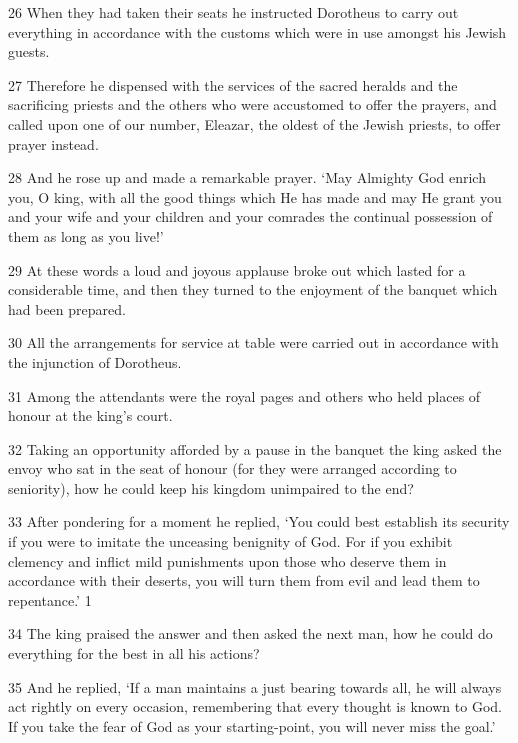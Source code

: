 \par 26 When they had taken their seats he instructed Dorotheus to carry out everything in accordance with the customs which were in use amongst his Jewish guests.

\par 27 Therefore he dispensed with the services of the sacred heralds and the sacrificing priests and the others who were accustomed to offer the prayers, and called upon one of our number, Eleazar, the oldest of the Jewish priests, to offer prayer instead.

\par 28 And he rose up and made a remarkable prayer. ‘May Almighty God enrich you, O king, with all the good things which He has made and may He grant you and your wife and your children and your comrades the continual possession of them as long as you live!’

\par 29 At these words a loud and joyous applause broke out which lasted for a considerable time, and then they turned to the enjoyment of the banquet which had been prepared.

\par 30 All the arrangements for service at table were carried out in accordance with the injunction of Dorotheus.

\par 31 Among the attendants were the royal pages and others who held places of honour at the king's court.

\par 32 Taking an opportunity afforded by a pause in the banquet the king asked the envoy who sat in the seat of honour (for they were arranged according to seniority), how he could keep his kingdom unimpaired to the end?

\par 33 After pondering for a moment he replied, ‘You could best establish its security if you were to imitate the unceasing benignity of God. For if you exhibit clemency and inflict mild punishments upon those who deserve them in accordance with their deserts, you will turn them from evil and lead them to repentance.’ 1

\par 34 The king praised the answer and then asked the next man, how he could do everything for the best in all his actions?

\par 35 And he replied, ‘If a man maintains a just bearing towards all, he will always act rightly on every occasion, remembering that every thought is known to God. If you take the fear of God as your starting-point, you will never miss the goal.’

